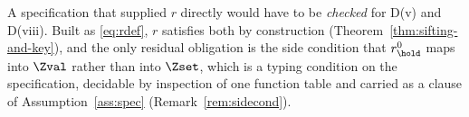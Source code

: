 
\begin{remark}\label{rem:rbuilt}
A specification that supplied $r$ directly would have to be \emph{checked}
for D(v) and D(viii). Built as \eqref{eq:rdef}, $r$ satisfies both by
construction (Theorem~\ref{thm:sifting-and-key}), and the only residual obligation is the
side condition that $r^{0}_{\hold}$ maps into $\Zval$ rather than into
$\Zset$, which is a typing condition on the specification, decidable by
inspection of one function table and carried as a clause of
Assumption~\ref{ass:spec} (Remark~\ref{rem:sidecond}).
\end{remark}
